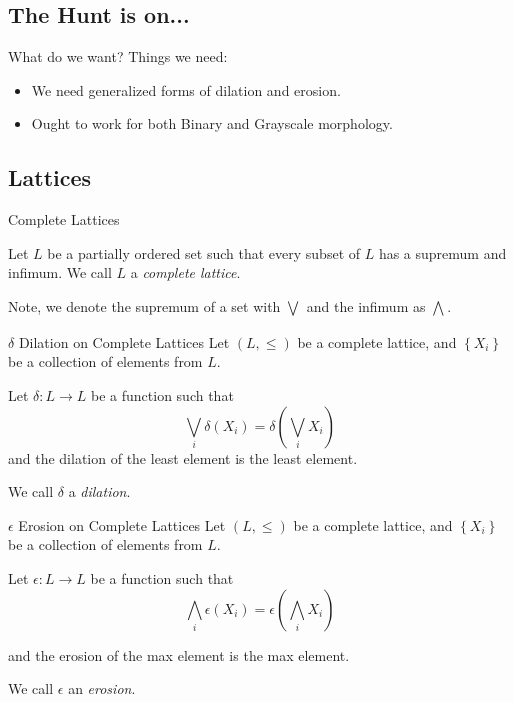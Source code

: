\documentclass{beamer}
\newcommand{\set}[1]{\left\lbrace #1 \right\rbrace}
\newcommand{\func}[3]{#1:#2\rightarrow#3}
\newcommand{\meet}[1]{\displaystyle\bigwedge_{#1}}
\newcommand{\join}[1]{\displaystyle\bigvee_{#1}}
\newcommand{\unidilate}{\delta}
\newcommand{\unierode}{\epsilon}
\newcommand{\partialless}{\leqslant}
\begin{document}
\subsection{The Hunt is on...}
\begin{frame}{What do we want?}
  Things we need:
  \begin{itemize}
    \item We need generalized forms of dilation and erosion.
    \item Ought to work for both Binary and Grayscale morphology.
  \end{itemize} 
\end{frame}

\subsection{Lattices}
\begin{frame}{Complete Lattices}
  \begin{definition}
    Let $L$ be a partially ordered set such that 
    every subset of $L$ has a supremum and infimum. 
    We call $L$ a \emph{complete lattice}.
  \end{definition}
  Note, we denote the supremum of a set with $\join{}$ and
  the infimum as $\meet{}$.
\end{frame}

\begin{frame}{$\unidilate$ Dilation on Complete Lattices}
   Let $(L, \partialless)$ be a complete lattice, and $\set{X_i}$ be
   a collection of elements from $L$.
   \begin{definition}
     Let $\func{\unidilate}{L}{L}$ be a function such that
       $$\join{i} \unidilate(X_i) = 
         \unidilate\left(\join{i}X_i\right)$$
     and the dilation of the least element is the least element.


     We call $\unidilate$ a \emph{dilation}.
   \end{definition}
\end{frame}

\begin{frame}{$\unierode$ Erosion on Complete Lattices}
   Let $(L, \partialless)$ be a complete lattice, and $\set{X_i}$ be
   a collection of elements from $L$.
   \begin{definition}
     Let $\func{\unierode}{L}{L}$ be a function such that
       $$\meet{i} \unierode(X_i) = 
         \unierode\left(\meet{i}X_i\right)$$

     and the erosion of the max element is the max element.

     We call $\unierode$ an \emph{erosion}.
   \end{definition}
\end{frame}
\end{document}
